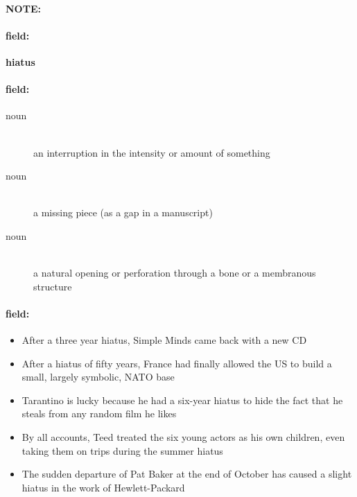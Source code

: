 \documentclass[12pt]{article}
\newenvironment{note}{\paragraph{NOTE:}}{}
\newenvironment{field}{\paragraph{field:}}{}
\begin{document}
\begin{note}
\begin{field}
\textbf{\large hiatus}
\end{field}


\begin{field}
\begin{description}
\item[noun] \hfill \\ 
an interruption in the intensity or amount of something

\item[noun] \hfill \\ 
a missing piece (as a gap in a manuscript)

\item[noun] \hfill \\ 
a natural opening or perforation through a bone or a membranous structure

\end{description}
\end{field}

\begin{field}
\begin{itemize}
\item After a three year hiatus, Simple Minds came back with a new CD
\item After a hiatus of fifty years, France had finally allowed the US to build a small, largely symbolic, NATO base
\item Tarantino is lucky because he had a six-year hiatus to hide the fact that he steals from any random film he likes
\item By all accounts, Teed treated the six young actors as his own children, even taking them on trips during the summer hiatus
\item The sudden departure of Pat Baker at the end of October has caused a slight hiatus in the work of Hewlett-Packard
\end{itemize}
\end{field}
\end{note}
\end{document}
